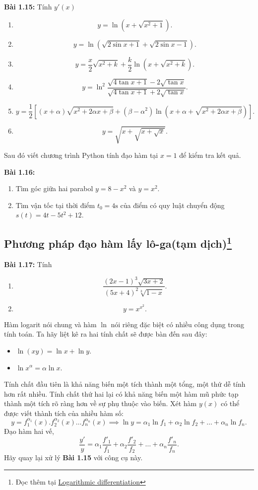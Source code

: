 \textbf{Bài 1.15:} Tính \(y'(x)\)
\begin{enumerate}[label=(\alph*)]
    \item \[y=\ln (x+\sqrt{x^2 +1}).\]
    \item \[y=\ln (\sqrt{2\sin x +1}+\sqrt{2\sin x -1}).\]
    \item \[y=\frac{x}{2}\sqrt{x^2 +k}+\frac{k}{2}\ln (x+\sqrt{x^2 +k}).\]
    \item \[y=\ln^2 \frac{\sqrt{4\tan x +1}-2\sqrt{\tan x}}{\sqrt{4\tan x +1}+2\sqrt{\tan x}}.\]
    \item \[y=\frac{1}{2}[(x+\alpha)\sqrt{x^2 +2\alpha x +\beta}+(\beta -\alpha^2)\ln(x+\alpha+\sqrt{x^2 +2\alpha x+\beta})].\]
    \item \[y=\sqrt{x+\sqrt{x+\sqrt{x}}}.\]
\end{enumerate}
Sau đó viết chương trình Python tính đạo hàm tại \(x=1\) để kiểm tra kết quả. 
\vspace{5pt}

\textbf{Bài 1.16:}
\begin{enumerate}[label=(\alph*)]
    \item Tìm góc giữa hai parabol \(y=8-x^2\) và \(y=x^2\).
    \item Tìm vận tốc tại thời điểm \(t_0 =4\mathrm{s}\) của điểm có quy luật chuyển động \(s(t)=4t-5t^2+12\).
\end{enumerate}

\subsection*{Phương pháp đạo hàm lấy lô-ga(tạm dịch)\footnote{Đọc thêm tại \href{https://en.wikipedia.org/wiki/Logarithmic_differentiation}{Logarithmic differentiation}}}
\textbf{Bài 1.17:} Tính 
\begin{enumerate}[label=(\alph*)]
    \item \[\frac{(2x-1)^3 \sqrt{3x+2}}{(5x+4)^2 \sqrt[3]{1-x}}.\]
    \item \[y=x^{x^2}.\]
\end{enumerate}
Hàm logarit nói chung và hàm \(\ln\) nói riêng đặc biệt có nhiều công dụng trong tính toán. Ta hãy liệt kê ra hai tính chất sẽ được bàn đến sau đây:
\begin{itemize}
    \item \(\ln(xy)=\ln x +\ln y \).
    \item \(\ln x^{\alpha} = \alpha \ln x\).
\end{itemize}
Tính chất đầu tiên là khả năng biến một tích thành một tổng, một thứ dễ tính hơn rất nhiều. Tính chất thứ hai lại có khả năng biến một hàm mũ phức tạp thành một tích rõ ràng hơn về sự phụ thuộc vào biến. \newline
Xét hàm \(y(x)\) có thể được viết thành tích của nhiều hàm số: \[y=f_{1}^{\alpha_1}(x).f_{2}^{\alpha_2}(x)\dots f_{n}^{\alpha_n}(x)\implies \ln y = \alpha_{1}\ln f_1 +\alpha_{2}\ln f_2 +\dots +\alpha_{n}\ln f_n.\]
Đạo hàm hai vế, \[\frac{y'}{y}=\alpha_{1} \frac{f'_1}{f_1}+\alpha_{2} \frac{f'_2}{f_2}+\dots +\alpha_{n} \frac{f'_n}{f_n}.\]
Hãy quay lại xử lý \textbf{Bài 1.15}  với công cụ này.
\vspace{5pt}

